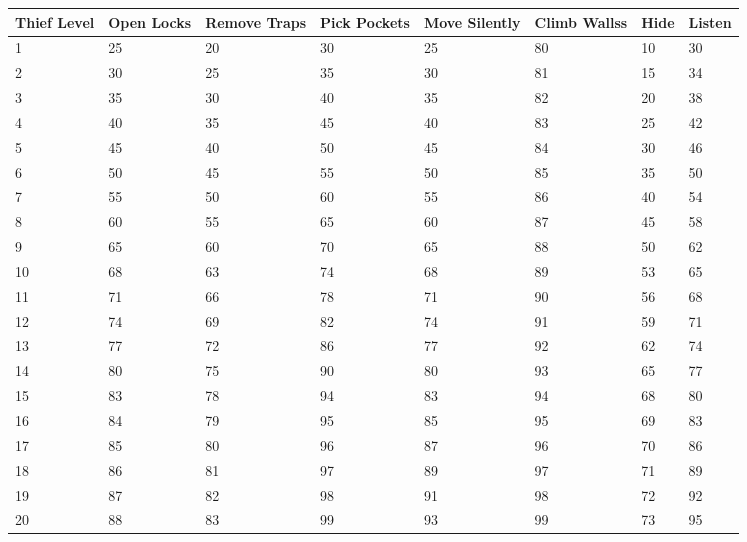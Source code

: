 \documentclass[a4paper,twoside,openany,10pt]{book}
\begin{document}
\begin{tabularx}{0.95\textwidth}{@{}XXXXXXXX@{}}



\textbf{Thief Level} & \textbf{Open Locks} & \textbf{Remove Traps } & \textbf{Pick Pockets} & \textbf{Move Silently}& \textbf{Climb Walls}s &Hide & Listen \\\toprule
1 & 25 & 20 & 30 & 25 & 80 & 10 & 30 \\\hline
2 & 30 & 25 & 35 & 30 & 81 & 15 & 34 \\\hline
3 & 35 & 30 & 40 & 35 & 82 & 20 & 38 \\\hline
4 & 40 & 35 & 45 & 40 & 83 & 25 & 42 \\\hline
5 & 45 & 40 & 50 & 45 & 84 & 30 & 46 \\\hline
6 & 50 & 45 & 55 & 50 & 85 & 35 & 50 \\\hline
7 & 55 & 50 & 60 & 55 & 86 & 40 & 54 \\\hline
8 & 60 & 55 & 65 & 60 & 87 & 45 & 58 \\\hline
9 & 65 & 60 & 70 & 65 & 88 & 50 & 62 \\\hline
10 & 68 & 63 & 74 & 68 & 89 & 53 & 65 \\\hline
11 & 71 & 66 & 78 & 71 & 90 & 56 & 68 \\\hline
12 & 74 & 69 & 82 & 74 & 91 & 59 & 71 \\\hline
13 & 77 & 72 & 86 & 77 & 92 & 62 & 74 \\\hline
14 & 80 & 75 & 90 & 80 & 93 & 65 & 77 \\\hline
15 & 83 & 78 & 94 & 83 & 94 & 68 & 80 \\\hline
16 & 84 & 79 & 95 & 85 & 95 & 69 & 83 \\\hline
17 & 85 & 80 & 96 & 87 & 96 & 70 & 86 \\\hline
18 & 86 & 81 & 97 & 89 & 97 & 71 & 89 \\\hline
19 & 87 & 82 & 98 & 91 & 98 & 72 & 92 \\\hline
20 & 88 & 83 & 99 & 93 & 99 & 73 & 95 \\\bottomrule
\end{tabularx}
\end{document}
